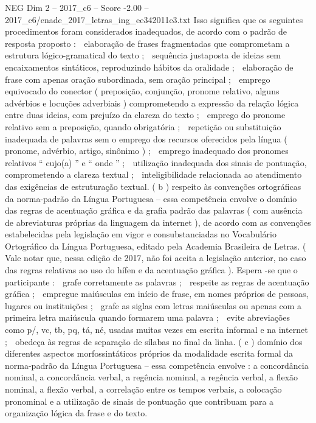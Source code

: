 \begin{textsample}{NEG Dim 2 – 2017\_c6 – Score -2.00 – 2017\_c6/enade\_2017\_letras\_ing\_ee342011e3.txt}
Isso significa que os seguintes procedimentos foram considerados inadequados, de acordo com o padrão de resposta proposto :  elaboração de frases fragmentadas que comprometam a estrutura lógico-gramatical do texto ;  sequência justaposta de ideias sem encaixamentos sintáticos, reproduzindo hábitos da oralidade ;  elaboração de frase com apenas oração subordinada, sem oração principal ;  emprego equivocado do conector ( preposição, conjunção, pronome relativo, alguns advérbios e locuções adverbiais ) comprometendo a expressão da relação lógica entre duas ideias, com prejuízo da clareza do texto ;  emprego do pronome relativo sem a preposição, quando obrigatória ;  repetição ou substituição inadequada de palavras sem o emprego dos recursos oferecidos pela língua ( pronome, advérbio, artigo, sinônimo ) ;  emprego inadequado dos pronomes relativos “ cujo(a) ” e “ onde ” ;  utilização inadequada dos sinais de pontuação, comprometendo a clareza textual ;  inteligibilidade relacionada ao atendimento das exigências de estruturação textual. ( b ) respeito às convenções ortográficas da norma-padrão da Língua Portuguesa – essa competência envolve o domínio das regras de acentuação gráfica e da grafia padrão das palavras ( com ausência de abreviaturas próprias da linguagem da internet ), de acordo com as convenções estabelecidas pela legislação em vigor e consubstanciadas no Vocabulário Ortográfico da Língua Portuguesa, editado pela Academia Brasileira de Letras. ( Vale notar que, nessa edição de 2017, não foi aceita a legislação anterior, no caso das regras relativas ao uso do hífen e da acentuação gráfica ).
Espera -se que o participante :  grafe corretamente as palavras ;  respeite as regras de acentuação gráfica ;  empregue maiúsculas em início de frase, em nomes próprios de pessoas, lugares ou instituições ;  grafe as siglas com letras maiúsculas ou apenas com a primeira letra maiúscula quando formarem uma palavra ;  evite abreviações como p/, vc, tb, pq, tá, né, usadas muitas vezes em escrita informal e na internet ;  obedeça às regras de separação de sílabas no final da linha. ( c ) domínio dos diferentes aspectos morfossintáticos próprios da modalidade escrita formal da norma-padrão da Língua Portuguesa – essa competência envolve : a concordância nominal, a concordância verbal, a regência nominal, a regência verbal, a flexão nominal, a flexão verbal, a correlação entre os tempos verbais, a colocação pronominal e a utilização de sinais de pontuação que contribuam para a organização lógica da frase e do texto.

\end{textsample}
